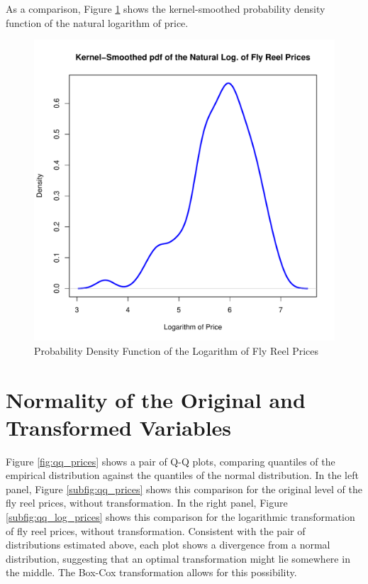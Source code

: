 \documentclass[11pt]{book}
\begin{document}
\pagebreak
As a comparison, Figure \ref{fig:density_log_prices} shows the kernel-smoothed probability density function of the natural logarithm of
price.

\begin{figure}[h!]
  \centering
  \includegraphics[scale = 0.5, keepaspectratio=true]{../Figures/density_log_prices}
  \caption{Probability Density Function of the Logarithm of Fly Reel Prices} \label{fig:density_log_prices}
\end{figure}




\pagebreak
\section*{Normality of the Original and Transformed Variables}

Figure \ref{fig:qq_prices} shows a pair of Q-Q plots, 
comparing quantiles of the empirical distribution against
the quantiles of the normal distribution. 
In the left panel, Figure \ref{subfig:qq_prices} shows this comparison 
for the original level of the fly reel prices, without transformation. 
In the right panel, Figure \ref{subfig:qq_log_prices} shows this comparison 
for the logarithmic transformation of fly reel prices, without transformation. 
Consistent with the pair of distributions estimated above, 
each plot shows a divergence from a normal distribution,
suggesting that an optimal transformation might lie somewhere in the middle.
The Box-Cox transformation allows for this possibility. 
\end{document}
